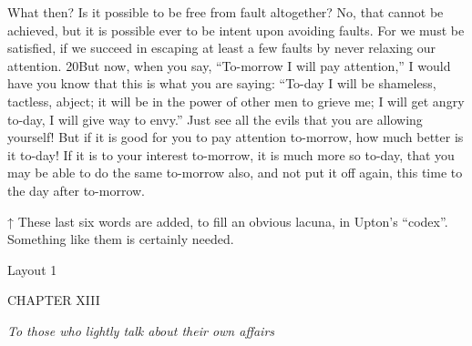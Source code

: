 What then? Is it possible to be free from fault altogether? No, that cannot be achieved, but it is possible ever to be intent upon avoiding faults. For we must be satisfied, if we succeed in escaping at least a few faults by never relaxing our attention. 20But now, when you say, ``To-morrow I will pay attention,'' I would have you know that this is what you are saying: ``To-day I will be shameless, tactless, abject; it will be in the power of other men to grieve me; I will get angry to-day, I will give way to envy.'' Just see all the evils that you are allowing yourself! But if it is good for you to pay attention to-morrow, how much better is it to-day! If it is to your interest to-morrow, it is much more so to-day, that you may be able to do the same to-morrow also, and not put it off again, this time to the day after to-morrow.



↑ These last six words are added, to fill an obvious lacuna, in Upton's ``codex''. Something like them is certainly needed.


Layout 1

CHAPTER XIII

\emph{To those who lightly talk about their own affairs}

